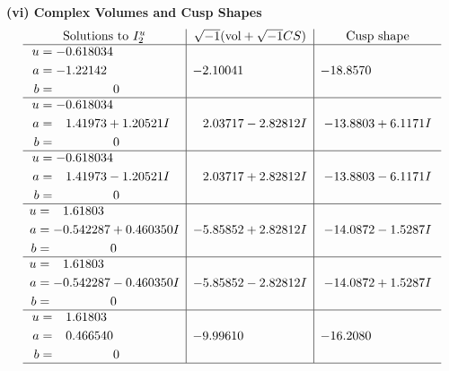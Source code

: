\documentclass[1p]{elsarticle_modified}
\theoremstyle{definition}
\newcommand{\I}{\sqrt{-1}}
\begin{document}
\newpage\flushleft \textbf{(vi) Complex Volumes and Cusp Shapes}
$$\begin{array}{c|c|c}  
\text{Solutions to }I^u_{2}& \I (\text{vol} + \sqrt{-1}CS) & \text{Cusp shape}\\
 \hline 
\begin{aligned}
u &= -0.618034\phantom{ +0.000000I} \\
a &= -1.22142\phantom{ +0.000000I} \\
b &= \phantom{-0.000000 } 0\end{aligned}
 & -2.10041\phantom{ +0.000000I} & -18.8570\phantom{ +0.000000I} \\ \hline\begin{aligned}
u &= -0.618034\phantom{ +0.000000I} \\
a &= \phantom{-}1.41973 + 1.20521 I \\
b &= \phantom{-0.000000 } 0\end{aligned}
 & \phantom{-}2.03717 - 2.82812 I & -13.8803 + 6.1171 I \\ \hline\begin{aligned}
u &= -0.618034\phantom{ +0.000000I} \\
a &= \phantom{-}1.41973 - 1.20521 I \\
b &= \phantom{-0.000000 } 0\end{aligned}
 & \phantom{-}2.03717 + 2.82812 I & -13.8803 - 6.1171 I \\ \hline\begin{aligned}
u &= \phantom{-}1.61803\phantom{ +0.000000I} \\
a &= -0.542287 + 0.460350 I \\
b &= \phantom{-0.000000 } 0\end{aligned}
 & -5.85852 + 2.82812 I & -14.0872 - 1.5287 I \\ \hline\begin{aligned}
u &= \phantom{-}1.61803\phantom{ +0.000000I} \\
a &= -0.542287 - 0.460350 I \\
b &= \phantom{-0.000000 } 0\end{aligned}
 & -5.85852 - 2.82812 I & -14.0872 + 1.5287 I \\ \hline\begin{aligned}
u &= \phantom{-}1.61803\phantom{ +0.000000I} \\
a &= \phantom{-}0.466540\phantom{ +0.000000I} \\
b &= \phantom{-0.000000 } 0\end{aligned}
 & -9.99610\phantom{ +0.000000I} & -16.2080\phantom{ +0.000000I}\\
 \hline 
 \end{array}$$\newpage
\end{document}

